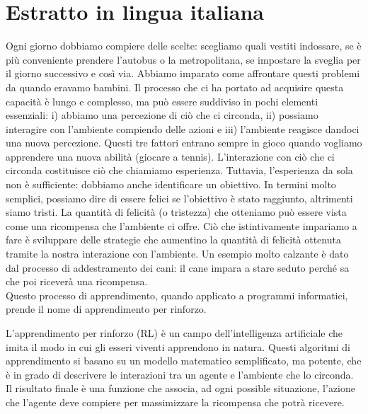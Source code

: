 \chapter*{Estratto in lingua italiana}

Ogni giorno dobbiamo compiere delle scelte: scegliamo quali vestiti indossare, se è più conveniente prendere l'autobus o la metropolitana, se impostare la sveglia per il giorno successivo e così via. Abbiamo imparato come affrontare questi problemi da quando eravamo bambini. Il processo che ci ha portato ad acquisire questa capacità è lungo e complesso, ma può essere suddiviso in pochi elementi essenziali: i) abbiamo una percezione di ciò che ci circonda, ii) possiamo interagire con l'ambiente compiendo delle azioni e iii) l'ambiente reagisce dandoci una nuova percezione. Questi tre fattori entrano sempre in gioco quando vogliamo apprendere una nuova abilità (\eg giocare a tennis). 
L'interazione con ciò che ci circonda costituisce ciò che chiamiamo esperienza. Tuttavia, l'esperienza da sola non è sufficiente: dobbiamo anche identificare un obiettivo. In termini molto semplici, possiamo dire di essere felici se l'obiettivo è stato raggiunto, altrimenti siamo tristi. La quantità di felicità (o tristezza) che otteniamo può essere vista come una ricompensa che l'ambiente ci offre. Ciò che istintivamente impariamo a fare è sviluppare delle strategie che aumentino la quantità di felicità ottenuta tramite la nostra interazione con l'ambiente. Un esempio molto calzante è dato dal processo di addestramento dei cani: il cane impara a stare seduto perché sa che poi riceverà una ricompensa.\\
Questo processo di apprendimento, quando applicato a programmi informatici, prende il nome di apprendimento per rinforzo.



L'apprendimento per rinforzo (RL) è un campo dell'intelligenza artificiale che imita il modo in cui gli esseri viventi apprendono in natura. Questi algoritmi di apprendimento si basano su un modello matematico semplificato, ma potente, che è in grado di descrivere le interazioni tra un agente e l'ambiente che lo circonda.
%
Il risultato finale è una funzione che associa, ad ogni possible situazione, l'azione che l'agente deve compiere per massimizzare la ricompensa che potrà ricevere.


